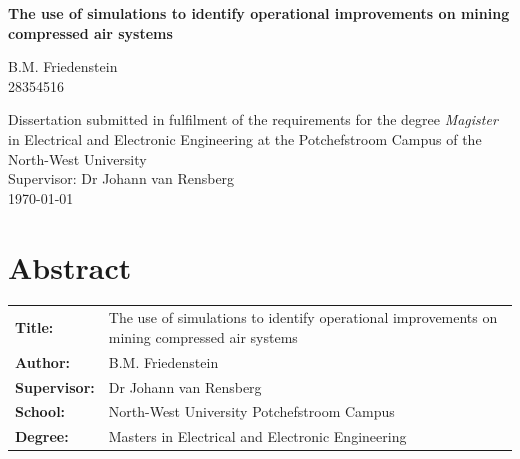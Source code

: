 \documentclass[12pt, english, oneside, open=any]{report}
\begin{document}
	
\begin{titlepage}
	\BgThispage	
		\vspace{0cm}
		\begin{center}
			\textbf{\singlespacing\huge{The use of simulations  to identify operational improvements on mining compressed air systems}\\
			}\par
			\vspace{3cm}
			\LARGE{B.M. Friedenstein \\28354516}\\
		\end{center}
	
	\vspace{2cm}
	
\begin{flushleft}
	{\singlespacing\centering \large Dissertation submitted in fulfilment of the requirements for the degree {\color{blue} \textit{Magister}} in {\color{blue}Electrical and Electronic Engineering} at the Potchefstroom Campus of the North-West University\\
	}
	\vspace{2cm}
	{\large \setlength{\parindent}{0.5cm} Supervisor: Dr Johann van Rensberg \\
	\vspace{2cm}
	\large{\monthyeardate\today}\\		
	}
\end{flushleft}
\end{titlepage}
\clearpage

\section*{Abstract}
	\vspace{0.2cm}
	\thispagestyle{plain}
	\setcounter{page}{2}
	\begin{tabular}{p{2.35cm}p{13cm}}
		\textbf{Title:} & The use of simulations to identify operational improvements on mining compressed air systems  \\
		\textbf{Author:} & B.M. Friedenstein \\
		\textbf{Supervisor:} & Dr Johann van Rensberg \\
		\textbf{School:} & North-West University Potchefstroom Campus\\
		\textbf{Degree:} & Masters in Electrical and Electronic Engineering \\
	\end{tabular}
	\vspace{1cm}
\end{document}
